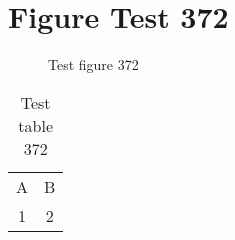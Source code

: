 \documentclass{article}
\begin{document}
\section{Figure Test 372}
\begin{figure}[h]
\caption{Test figure 372}
\end{figure}
\begin{table}[h]
\caption{Test table 372}
\begin{tabular}{cc}
A & B \\
1 & 2
\end{tabular}
\end{table}
\end{document}
